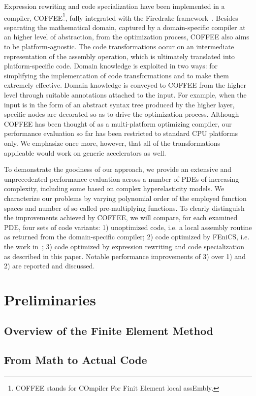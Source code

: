 Expression rewriting and code specialization have been implemented in a compiler, COFFEE\footnote{COFFEE stands for COmpiler For Finit Element local assEmbly.}, fully integrated with the Firedrake framework~\cite{Luporini}. Besides separating the mathematical domain, captured by a domain-specific compiler at an higher level of abstraction, from the optimization process, COFFEE also aims to be platform-agnostic. The code transformations occur on an intermediate representation of the assembly operation, which is ultimately translated into platform-specific code. Domain knowledge is exploited in two ways: for simplifying the implementation of code transformations and to make them extremely effective. Domain knowledge is conveyed to COFFEE from the higher level through suitable annotations attached to the input. For example, when the input is in the form of an abstract syntax tree produced by the higher layer, specific nodes are decorated so as to drive the optimization process. Although COFFEE has been thought of as a multi-platform optimizing compiler, our performance evaluation so far has been restricted to standard CPU platforms only. We emphasize once more, however, that all of the transformations applicable would work on generic accelerators as well.

To demonstrate the goodness of our approach, we provide an extensive and unprecedented performance evaluation across a number of PDEs of increasing complexity, including some based on complex hyperelasticity models. We characterize our problems by varying polynomial order of the employed function spaces and number of so called pre-multiplying functions. To clearly distinguish the improvements achieved by COFFEE, we will compare, for each examined PDE, four sets of code variants: 1) unoptimized code, i.e. a local assembly routine as returned from the domain-specific compiler; 2) code optimized by FEniCS, i.e. the work in~\cite{quadrature1}; 3) code optimized by expression rewriting and code specialization as described in this paper. Notable performance improvements of 3) over 1) and 2) are reported and discussed.

\section{Preliminaries}
\subsection{Overview of the Finite Element Method}
\subsection{From Math to Actual Code}


